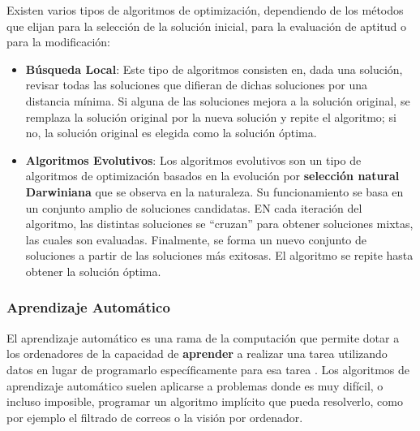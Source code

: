 Existen varios tipos de algoritmos de optimización, dependiendo de los métodos que elijan para la selección de la solución inicial, para la evaluación de aptitud o para la modificación:
\begin{itemize}
\item \textbf{Búsqueda Local}: Este tipo de algoritmos consisten en, dada una solución, revisar todas las soluciones que difieran de dichas soluciones por una distancia mínima. Si alguna de las soluciones mejora a la solución original, se remplaza la solución original por la nueva solución y repite el algoritmo; si no, la solución original es elegida como la solución óptima.
\item \textbf{Algoritmos Evolutivos}: Los algoritmos evolutivos son un tipo de algoritmos de optimización basados en la evolución por \textbf{selección natural Darwiniana} que se observa en la naturaleza. Su funcionamiento se basa en un conjunto amplio de soluciones candidatas. EN cada iteración del algoritmo, las distintas soluciones se ``cruzan'' para obtener soluciones mixtas, las cuales son evaluadas. Finalmente, se forma un nuevo conjunto de soluciones a partir de las soluciones más exitosas. El algoritmo se repite hasta obtener la solución óptima.
\end{itemize} 

\subsubsection{Aprendizaje Automático}
El aprendizaje automático es una rama de la computación que permite dotar a los ordenadores de la capacidad de \textbf{aprender} a realizar una tarea utilizando datos en lugar de programarlo específicamente para esa tarea \cite{machine_learning}. Los algoritmos de aprendizaje automático suelen aplicarse a problemas donde es muy difícil, o incluso imposible, programar un algoritmo implícito que pueda resolverlo, como por ejemplo el filtrado de correos o la visión por ordenador.

